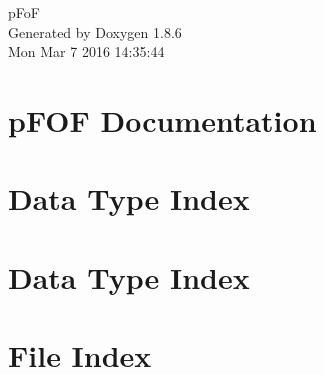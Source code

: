 \documentclass[twoside]{book}
\newcommand{\clearemptydoublepage}{%
  \newpage{\pagestyle{empty}\cleardoublepage}%
}
\begin{document}
\hypersetup{pageanchor=false}
\begin{titlepage}
\vspace*{7cm}
\begin{center}%
{\Large p\-Fo\-F }\\
\vspace*{1cm}
{\large Generated by Doxygen 1.8.6}\\
\vspace*{0.5cm}
{\small Mon Mar 7 2016 14:35:44}\\
\end{center}
\end{titlepage}
\clearemptydoublepage
\tableofcontents
\clearemptydoublepage
{}
\hypersetup{pageanchor=true}

\chapter{p\-F\-O\-F Documentation}
\label{index}\hypertarget{index}{}
\chapter{Data Type Index}

\chapter{Data Type Index}

\chapter{File Index}

\end{document}

